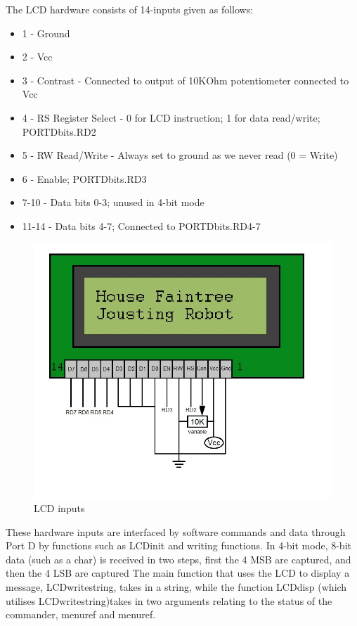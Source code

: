 \documentclass{article}
\begin{document}
The LCD hardware consists of 14-inputs given as follows:
\begin{itemize}
	\item 1 - Ground
	\item 2 - Vcc
	\item 3 - Contrast - Connected to output of 10KOhm potentiometer connected to Vcc
	\item 4 - RS Register Select - 0 for LCD instruction; 1 for data read/write; PORTDbits.RD2
	\item 5 - RW Read/Write - Always set to ground as we never read (0 = Write)
	\item 6 - Enable; PORTDbits.RD3
	\item 7-10 - Data bits 0-3; unused in 4-bit mode
	\item 11-14 - Data bits 4-7; Connected to PORTDbits.RD4-7
\end{itemize}
\begin{figure}[H]
		
	\includegraphics[scale=0.45]{LCD.jpg}
	\centering
	\caption{LCD inputs}
\end{figure}
	These hardware inputs are interfaced by software commands and data through Port D by functions such as LCD\textunderscore init and writing functions. In 4-bit mode, 8-bit data (such as a char) is received in two steps, first the 4 MSB are captured, and then the 4 LSB are captured
	The main function that uses the LCD to display a message, LCD\textunderscore write\textunderscore string, takes in a string, while the function LCD\textunderscore disp (which utilises LCD\textunderscore write\textunderscore string)takes in two arguments relating to the status of the commander, menu\textunderscore ref and menu\textunderscore ref. 
\end{document}
